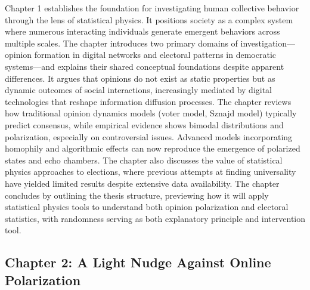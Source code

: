Chapter 1 establishes the foundation for investigating human collective behavior through the lens of statistical physics. It positions society as a complex system where numerous interacting individuals generate emergent behaviors across multiple scales. The chapter introduces two primary domains of investigation—opinion formation in digital networks and electoral patterns in democratic systems—and explains their shared conceptual foundations despite apparent differences. It argues that opinions do not exist as static properties but as dynamic outcomes of social interactions, increasingly mediated by digital technologies that reshape information diffusion processes. The chapter reviews how traditional opinion dynamics models (voter model, Sznajd model) typically predict consensus, while empirical evidence shows bimodal distributions and polarization, especially on controversial issues. Advanced models incorporating homophily and algorithmic effects can now reproduce the emergence of polarized states and echo chambers. The chapter also discusses the value of statistical physics approaches to elections, where previous attempts at finding universality have yielded limited results despite extensive data availability. The chapter concludes by outlining the thesis structure, previewing how it will apply statistical physics tools to understand both opinion polarization and electoral statistics, with randomness serving as both explanatory principle and intervention tool.

\subsection*{Chapter 2: A Light Nudge Against Online Polarization}

